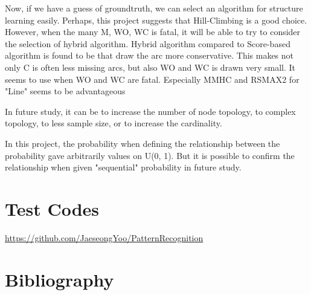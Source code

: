\documentclass[runningheads,a4paper]{llncs}
\begin{document}
Now, if we have a guess of groundtruth, we can select an algorithm for structure learning easily. Perhaps, this project suggests that Hill-Climbing is a good choice. However, when the many M, WO, WC is fatal, it will be able to try to consider the selection of hybrid algorithm. Hybrid algorithm compared to Score-based algorithm is found to be that draw the arc more conservative. This makes not only C is often less missing arcs, but also WO and WC is drawn very small. It seems to use when WO and WC are fatal. Especially MMHC and RSMAX2 for "Line" seems to be advantageous

In future study, it can be to increase the number of node topology, to complex topology, to less sample size, or to increase the cardinality.

In this project, the probability when defining the relationship between the probability gave arbitrarily values on U(0, 1). But it is possible to confirm the relationship when given "sequential" probability in future study.



\section*{Test Codes}
\url{https://github.com/JaeseongYoo/PatternRecognition}



\section*{Bibliography}

%
\end{document}
